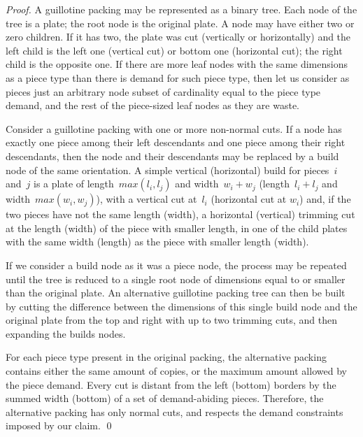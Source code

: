 \documentclass[runningheads]{llncs}
\begin{document}
\begin{proof}
A guillotine packing may be represented as a binary tree.
Each node of the tree is a plate; the root node is the original plate.
A node may have either two or zero children. If it has two, the plate was cut (vertically or horizontally) and the left child is the left one (vertical cut) or bottom one (horizontal cut); the right child is the opposite one.
If there are more leaf nodes with the same dimensions as a piece type than there is demand for such piece type, then let us consider as pieces just an arbitrary node subset of cardinality equal to the piece type demand, and the rest of the piece-sized leaf nodes as they are waste.

Consider a guillotine packing with one or more non-normal cuts.
If a node has exactly one piece among their left descendants and one piece among their right descendants, then the node and their descendants may be replaced by a build node of the same orientation.
A simple vertical (horizontal) build for pieces~\(i\) and~\(j\) is a plate of length~\(max(l_i, l_j)\) and width~\(w_i + w_j\) (length~\(l_i + l_j\) and width~\(max(w_i, w_j)\)), with a vertical cut at~\(l_i\) (horizontal cut at \(w_i\)) and, if the two pieces have not the same length (width), a horizontal (vertical) trimming cut at the length (width) of the piece with smaller length, in one of the child plates with the same width (length) as the piece with smaller length (width).

If we consider a build node as it was a piece node, the process may be repeated until the tree is reduced to a single root node of dimensions equal to or smaller than the original plate.
An alternative guillotine packing tree can then be built by cutting the difference between the dimensions of this single build node and the original plate from the top and right with up to two trimming cuts, and then expanding the builds nodes.

For each piece type present in the original packing, the alternative packing contains either the same amount of copies, or the maximum amount allowed by the piece demand.
Every cut is distant from the left (bottom) borders by the summed width (bottom) of a set of demand-abiding pieces.
Therefore, the alternative packing has only normal cuts, and respects the demand constraints imposed by our claim. \qed


\end{proof}
\end{document}
